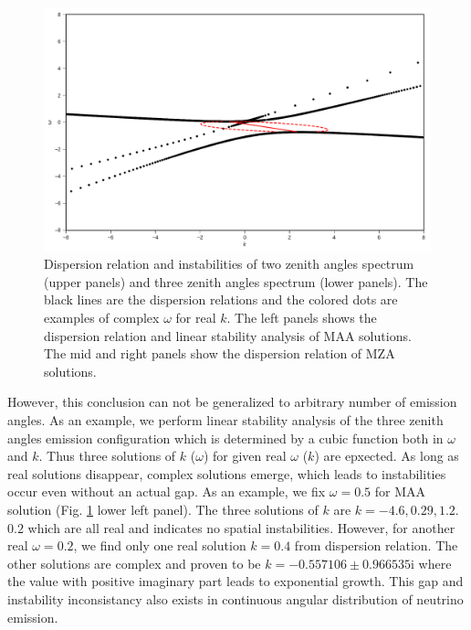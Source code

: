 \documentclass[%
preprint,
 amsmath,amssymb,
 aps,
 prd
]{revtex4-1}
\begin{document}
\begin{figure}[!htb]
\endminipage\hfill
{}
  \includegraphics[width=\linewidth]{assets/spectDB3WC4DRDBMZAPltBlob.pdf}
\endminipage\hfill
\caption{Dispersion relation and instabilities of two zenith angles spectrum (upper panels) and three zenith angles spectrum (lower panels). The black lines are the dispersion relations and the colored dots are examples of complex $\omega$ for real $k$. The left panels shows the dispersion relation and linear stability analysis of MAA solutions. The mid and right panels show the dispersion relation of MZA solutions.}
\label{fig-dr-db}
\end{figure}


However, this conclusion can not be generalized to arbitrary number of emission angles. As an example, we perform linear stability analysis of the three zenith angles emission configuration which is determined by a cubic function both in $\omega$ and $k$. Thus three solutions of $k$ ($\omega$) for given real $\omega$ ($k$) are epxected. As long as real solutions disappear, complex solutions emerge, which leads to instabilities occur even without an actual gap. As an example, we fix $\omega= 0.5$ for MAA solution (Fig. \ref{fig-dr-db} lower left panel). The three solutions of $k$ are $k=-4.6, 0.29, 1.2$.  $0.2$ which are all real and indicates no spatial instabilities. However, for another real $\omega = 0.2$, we find only one real solution $k=0.4$ from dispersion relation. The other solutions are complex and proven to be $k = -0.557106\pm 0.966535\mathrm i$ where the value with positive imaginary part leads to exponential growth. This gap and instability inconsistancy also exists in continuous angular distribution of neutrino emission.
\end{document}
